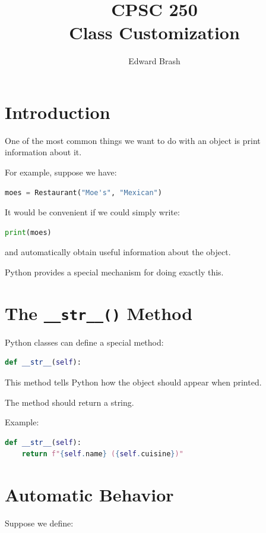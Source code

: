 \documentclass[11pt]{article}
\title{CPSC 250 \\ Class Customization}
\author{Edward Brash}
\date{}
\begin{document}
\maketitle

\section{Introduction}

One of the most common things we want to do with an object is print information about it.

For example, suppose we have:

\begin{lstlisting}[language=Python]
moes = Restaurant("Moe's", "Mexican")
\end{lstlisting}

It would be convenient if we could simply write:

\begin{lstlisting}[language=Python]
print(moes)
\end{lstlisting}

and automatically obtain useful information about the object.

Python provides a special mechanism for doing exactly this.

\section{The \texttt{\_\_str\_\_()} Method}

Python classes can define a special method:

\begin{lstlisting}[language=Python]
def __str__(self):
\end{lstlisting}

This method tells Python how the object should appear when printed.

The method should return a string.

Example:

\begin{lstlisting}[language=Python]
def __str__(self):
    return f"{self.name} ({self.cuisine})"
\end{lstlisting}

\section{Automatic Behavior}

Suppose we define:
\end{document}

